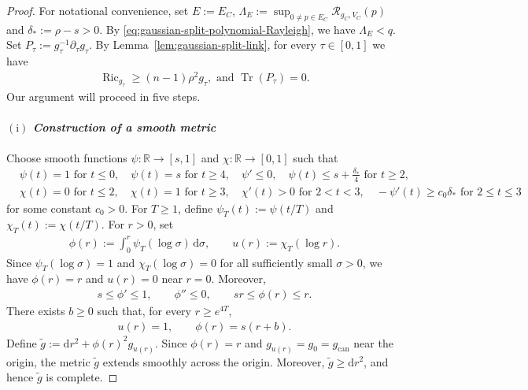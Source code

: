 \documentclass[11pt,reqno]{amsart}
\numberwithin{equation}{section}
\theoremstyle{definition}
\theoremstyle{remark}
\def\cR {\mathcal{R}}
\newcommand{\Tr}{\operatorname{Tr}}
\newcommand{\ta}{\tau}
\newcommand{\ud}{\mathrm{d}}
\newcommand{\0}{\emptyset}
\newcommand{\bbR}{\mathbb R}
\newcommand{\Ric}{\operatorname{Ric}}
\newcommand{\can}{\mathrm{can}}
\begin{document}
\begin{proof}
For notational convenience, set $E:=E_C$,  $\Lambda_E:=\sup_{0\neq p\in E_C} \cR_{g_C,V_C}(p)$ and $\delta_*:=\rho-s>0$. By \eqref{eq:gaussian-split-polynomial-Rayleigh}, we have $\Lambda_E<q.$ Set $P_\ta := g_\ta^{-1}\partial_\ta g_\ta.$ By Lemma~\ref{lem:gaussian-split-link}, for every $\ta\in[0,1]$ we have
\begin{align}\label{eq:gaussian-split-smoothing-Ricci-hypothesis}
        \Ric_{g_\ta}
        \geq
        (n-1)\rho^2g_\ta,\text{ and } \Tr(P_\ta)=0.
\end{align}
Our argument will proceed in five steps.
\paragraph{$\mathrm{(i)}$ \textit{Construction of a smooth metric}} Choose smooth functions $\psi:\bbR\to[s,1]$ and $\chi:\bbR\to[0,1]$ such that
\begin{align}
        &\psi(t)=1
        \text{ for }t\leq0,
        \quad
        \psi(t)=s
        \text{ for }t\geq4,
        \quad
        \psi'\leq0,\quad 
        \psi(t)
        \leq
        s+\frac{\delta_*}{4}
        \text{ for }t\geq2, \qquad \label{eq:gaussian-split-profile-small}\\
        &\chi(t)=0 \text{ for }t\leq2,\quad 
        \chi(t)=1 \text{ for }t\geq3,\quad 
        \chi'(t)>0 \text{ for }2<t<3,\quad 
        -\psi'(t)
        \geq
        c_0\delta_*
        \text{ for }2\leq t\leq 3 \qquad \label{eq:gaussian-split-profile-negative}
\end{align}
for some constant $c_0>0$.  For $T\geq1$, define $\psi_T(t):=\psi(t/T)$ and $\chi_T(t):=\chi(t/T).$ For $r>0$, set
\begin{align}\label{eq:gaussian-split-phi-u-definition}
        \phi(r)
        :=
        \int_0^r \psi_T(\log\sigma)\,\ud\sigma,
        \qquad
        u(r):=\chi_T(\log r).
\end{align}
Since $\psi_T(\log\sigma)=1$ and $\chi_T(\log\sigma)=0$ for all sufficiently small $\sigma>0$, we have $\phi(r)=r$ and $u(r)=0$ near $r=0$. Moreover,
\begin{align}\label{eq:gaussian-split-phi-bounds}
        s\leq\phi'\leq1,
        \qquad
        \phi''\leq0,
        \qquad
        sr\leq\phi(r)\leq r.
\end{align}
There exists $b\geq0$ such that, for every $r\geq e^{4T}$,
\begin{align}\label{eq:gaussian-split-phi-end}
        u(r)=1,
        \qquad
        \phi(r)=s(r+b).
\end{align}
Define $ \widetilde g :=\ud r^2+\phi(r)^2g_{u(r)}.$ Since $\phi(r)=r$ and $g_{u(r)}=g_0=g_\can$ near the origin, the metric
$\widetilde g$ extends smoothly across the origin. Moreover,
$\widetilde g\geq\ud r^2$, and hence $\widetilde g$ is complete.


\end{proof}
\end{document}
